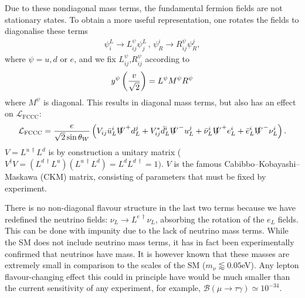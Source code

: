 Due to these nondiagonal mass terms, the fundamental fermion fields are not stationary states. To obtain a more useful representation, one rotates the fields to diagonalise these terms
\begin{align}
  \psi^L_i\to L^{\psi}_{ij} \psi^L_j \,,\, \psi_R^i \to R^{\psi}_{ij} \psi_R^j,
\end{align}
where $\psi=u,d$ or $e$, and we fix $L^{\psi}_{ij}$,$R^{\psi}_{ij}$ according to
\begin{align}
  y^{\psi} \left({v\over \sqrt{2}}\right)= L^{\psi} M^{\psi} R^{\psi}
\end{align}
where $M^{\psi}$ is diagonal. This results in diagonal mass terms, but also has an effect on $\mathcal{L}_{\text{FCCC}}$:
\begin{align}
  \mathcal{L}_{\text{FCCC}} = {e\over \sqrt{2}\sin\theta_W} \left( V_{ij} \bar{u}_L^i \slashed{W}^+  d_L^j + V_{ij}^* \bar{d}_L^i \slashed{W}^- u_L^j + \bar{\nu}_L^i \slashed{W}^+ e_L^i + \bar{e}_L^i \slashed{W}^- \nu_L^i \right).
  \label{eq:FCCC}
\end{align}
$V = L^{u\,\dagger} L^d$ is by construction a unitary matrix ($V^{\dagger}V = (L^{d\,\dagger} L^u)(L^{u\,\dagger} L^d) = L^d L^{d\,\dagger} = 1)$. $V$ is the famous Cabibbo–Kobayashi–Maskawa (CKM) matrix, consisting of parameters that must be fixed by experiment.

There is no non-diagonal flavour structure in the last two terms because we have redefined the neutrino fields: $\nu_L \to L^{e\,\dagger} \nu_L$, absorbing the rotation of the $e_L$ fields. This can be done with impunity due to the lack of neutrino mass terms. While the SM does not include neutrino mass terms, it has in fact been experimentally confirmed that neutrinos have mass. It is however known that these masses are extremely small in comparison to the scales of the SM ($m_{\nu}\lessapprox 0.05$eV). Any lepton flavour-changing effect this could in principle have would be much smaller than the current sensitivity of any experiment, for example, $\mathcal{B}(\mu\to \tau \gamma) \simeq 10^{-34}$.

